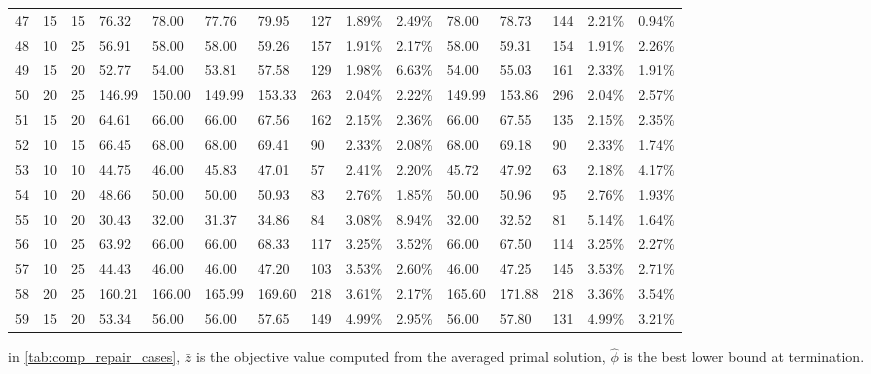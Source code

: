 \begin{longtable}{l|ll|ll|lllll|lllll}
  47 & 15                         & 15                         & 76.32                     & 78.00       & 77.76         & 79.95  & 127 & 1.89\%  & 2.49\% & 78.00  & 78.73  & 144 & 2.21\%  & 0.94\%  \\
  48 & 10                         & 25                         & 56.91                     & 58.00       & 58.00         & 59.26  & 157 & 1.91\%  & 2.17\% & 58.00  & 59.31  & 154 & 1.91\%  & 2.26\%  \\
  49 & 15                         & 20                         & 52.77                     & 54.00       & 53.81         & 57.58  & 129 & 1.98\%  & 6.63\% & 54.00  & 55.03  & 161 & 2.33\%  & 1.91\%  \\
  50 & 20                         & 25                         & 146.99                    & 150.00      & 149.99        & 153.33 & 263 & 2.04\%  & 2.22\% & 149.99 & 153.86 & 296 & 2.04\%  & 2.57\%  \\
  51 & 15                         & 20                         & 64.61                     & 66.00       & 66.00         & 67.56  & 162 & 2.15\%  & 2.36\% & 66.00  & 67.55  & 135 & 2.15\%  & 2.35\%  \\
  52 & 10                         & 15                         & 66.45                     & 68.00       & 68.00         & 69.41  & 90  & 2.33\%  & 2.08\% & 68.00  & 69.18  & 90  & 2.33\%  & 1.74\%  \\
  53 & 10                         & 10                         & 44.75                     & 46.00       & 45.83         & 47.01  & 57  & 2.41\%  & 2.20\% & 45.72  & 47.92  & 63  & 2.18\%  & 4.17\%  \\
  54 & 10                         & 20                         & 48.66                     & 50.00       & 50.00         & 50.93  & 83  & 2.76\%  & 1.85\% & 50.00  & 50.96  & 95  & 2.76\%  & 1.93\%  \\
  55 & 10                         & 20                         & 30.43                     & 32.00       & 31.37         & 34.86  & 84  & 3.08\%  & 8.94\% & 32.00  & 32.52  & 81  & 5.14\%  & 1.64\%  \\
  56 & 10                         & 25                         & 63.92                     & 66.00       & 66.00         & 68.33  & 117 & 3.25\%  & 3.52\% & 66.00  & 67.50  & 114 & 3.25\%  & 2.27\%  \\
  57 & 10                         & 25                         & 44.43                     & 46.00       & 46.00         & 47.20  & 103 & 3.53\%  & 2.60\% & 46.00  & 47.25  & 145 & 3.53\%  & 2.71\%  \\
  58 & 20                         & 25                         & 160.21                    & 166.00      & 165.99        & 169.60 & 218 & 3.61\%  & 2.17\% & 165.60 & 171.88 & 218 & 3.36\%  & 3.54\%  \\
  59 & 15                         & 20                         & 53.34                     & 56.00       & 56.00         & 57.65  & 149 & 4.99\%  & 2.95\% & 56.00  & 57.80  & 131 & 4.99\%  & 3.21\%  \\
  \bottomrule
\end{longtable}

\small
in \ref{tab:comp_repair_cases}, $\bar z$ is the objective value computed from the averaged primal solution,
$\hat \phi$ is the best lower bound at termination.

\normalsize